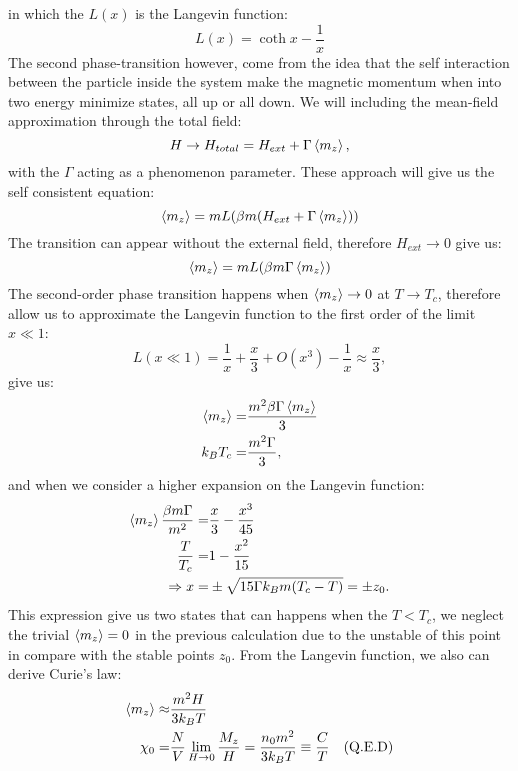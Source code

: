 \documentclass[a4paper]{article}
\begin{document}
	in which the \(L(x)\) is the Langevin function:
	\begin{equation}
		L(x) = \coth x - \frac{1}{x}
	\end{equation}
\quad The second phase-transition however, come from the idea that the self interaction between the particle inside the system make the magnetic momentum when into two energy minimize states, all up or all down. We will including the mean-field approximation through the total field:
\begin{equation}
	H \to H_{total}  = H_{ext} + \Gamma \ev{m_z},
\end{equation}
with the \(\Gamma\) acting as a phenomenon parameter. These approach will give us the self consistent equation:
\begin{equation}
	\ev{m_z} = m L(\beta m (H_{ext} + \Gamma \ev{m_z}))
\end{equation}
The transition can appear without the external field, therefore \(H_{ext} \to 0\) give us:
\begin{equation}
	\ev{m_z} = m L(\beta m \Gamma \ev{m_z})
\end{equation}
The second-order phase transition happens when \(\ev{m_z} \to 0\) at \(T \to T_c\), therefore allow us to approximate the Langevin function to the first order of the limit \(x \ll 1\):
\begin{equation}
	L(x\ll 1) = \frac{1}{x} + \frac{x}{3} +O(x^3) - \frac{1}{x} \approx \frac{x}{3},
\end{equation}
give us:
\begin{align}
	\ev{m_z} =& \frac{m^2 \beta \Gamma \ev{m_z}}{3}\nonumber\\
	k_B T_c  =& \frac{m^2 \Gamma}{3},
\end{align}
and when we consider a higher expansion on the Langevin function:
\begin{align}
	\ev{m_z}\frac{\beta m \Gamma}{m^2} =& \frac{x}{3} - \frac{x^3}{45} \nonumber\\
	\frac{T}{T_c} =& 1 - \frac{x^2}{15} \nonumber\\
	\Rightarrow x =& \pm \sqrt{15\Gamma k_B m (T_c-T)} = \pm z_0.
\end{align}
\quad This expression give us two states that can happens when the \(T < T_c\), we neglect the trivial \(\ev{m_z} = 0\) in the previous calculation due to the unstable of this point in compare with the stable points \(z_0\). From the Langevin function, we also can derive Curie's law:
\begin{align}
	\ev{m_z} \approx& \frac{m^2 H}{3 k_B T} \nonumber\\
	\chi_ 0 =& \frac{N}{V} \lim_{H \to 0} \frac{M_z}{H} = \frac{n_0 m^2}{3k_B T} \equiv \frac{C}{T}\quad \text{(Q.E.D)}
\end{align}
\end{document}

